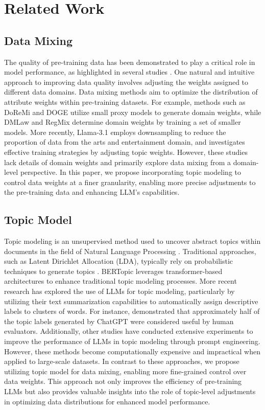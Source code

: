 \section{Related Work}
\subsection{Data Mixing} 
The quality of pre-training data has been demonstrated to play a critical role in model performance, as highlighted in several studies \cite{pretrainersguide, dataeverywhere}. 
One natural and intuitive approach to improving data quality involves adjusting the weights assigned to different data domains. 
Data mixing methods aim to optimize the distribution of attribute weights within pre-training datasets. 
For example, methods such as DoReMi \cite{doremi} and DOGE \cite{doge} utilize small proxy models to generate domain weights, while DMLaw \cite{dmlaw} and RegMix \cite{regmix} determine domain weights by training a set of smaller models.
More recently, Llama-3.1 \cite{dubey2024llama} employs downsampling to reduce the proportion of data from the arts and entertainment domain, and \citet{chen2024towards} investigates effective training strategies by adjusting topic weights. 
However, these studies lack details of domain weights and primarily explore data mixing from a domain-level perspective.
In this paper, we propose incorporating topic modeling to control data weights at a finer granularity, enabling more precise adjustments to the pre-training data and enhancing LLM's capabilities.

\subsection{Topic Model} 
Topic modeling is an unsupervised method used to uncover abstract topics within documents in the field of Natural Language Processing \cite{topicsurvey}. 
Traditional approaches, such as Latent Dirichlet Allocation (LDA), typically rely on probabilistic techniques to generate topics \cite{blei2003latent}. 
BERTopic \cite{grootendorst2020bertopic} leverages transformer-based architectures to enhance traditional topic modeling processes.
More recent research has explored the use of LLMs for topic modeling, particularly by utilizing their text summarization capabilities to automatically assign descriptive labels to clusters of words. 
For instance, \cite{rijcken2023towards} demonstrated that approximately half of the topic labels generated by ChatGPT were considered useful by human evaluators. 
Additionally, other studies \cite{mu2024addressing, mu2024large, rijcken2023towards} have conducted extensive experiments to improve the performance of LLMs in topic modeling through prompt engineering.
However, these methods become computationally expensive and impractical when applied to large-scale datasets. 
In contrast to these approaches, we propose utilizing topic model for data mixing, enabling more fine-grained control over data weights. 
This approach not only improves the efficiency of pre-training LLMs but also provides valuable insights into the role of topic-level adjustments in optimizing data distributions for enhanced model performance.